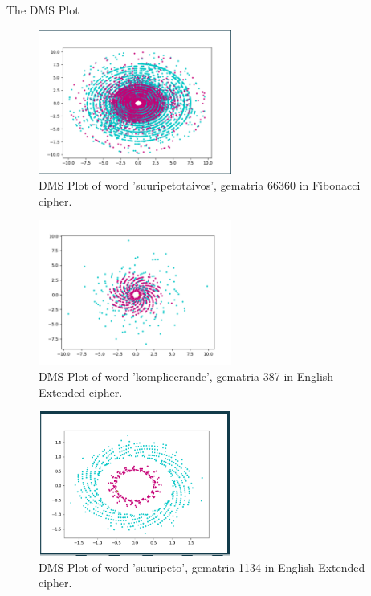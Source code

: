 \documentclass[a4paper,10pt]{article}
\begin{document}
   \begin{section}{The DMS Plot}

     \begin{figure}
       \centering
       \includegraphics[width = 240px, height = 180px]{suuripetotaivos66360}
       \caption{DMS Plot of word 'suuripetotaivos', gematria 66360 in Fibonacci cipher.}
     \end{figure}

     \begin{figure}
       \centering
       \includegraphics[width = 240px, height = 180px]{komplicerande387}
       \caption{DMS Plot of word 'komplicerande', gematria 387 in English Extended cipher.}
     \end{figure}

     \begin{figure}
       \centering
       \includegraphics[width = 240px, height = 180px]{suuripeto1134}
       \caption{DMS Plot of word 'suuripeto', gematria 1134 in English Extended cipher.}
     \end{figure}
     
   \end{section}
   

   
\end{document}

